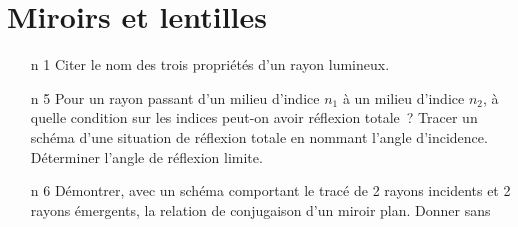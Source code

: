\documentclass[a4paper, 10pt, final, garamond]{book}
\begin{document}
\setcounter{chapter}{0}


\chapter{Miroirs et lentilles}

\begin{enumerate}[label=\sqenumi, leftmargin=10pt]
	\item[n]{1}%
	Citer le nom des trois propriétés d'un rayon lumineux.
	\smallbreak
	\item[n]{5} %
	Pour un rayon passant d'un milieu d'indice $n_1$ à un milieu d'indice $n_2$, à
	quelle condition sur les indices peut-on avoir réflexion totale~? Tracer un
	schéma d'une situation de réflexion totale en nommant l'angle d'incidence.
	Déterminer l'angle de réflexion limite.
	\smallbreak
	\noindent
	\begin{isd}[righthand ratio=.3]
		\vspace*{-20pt}
		\tcblower
		\vspace{-15pt}
		\begin{center}
		\end{center}
	\end{isd}
	\item[n]{6} %
	Démontrer, avec un schéma comportant le tracé de 2 rayons incidents et 2
	rayons émergents, la relation de conjugaison d'un miroir plan. Donner sans

\end{enumerate}
\end{document}
